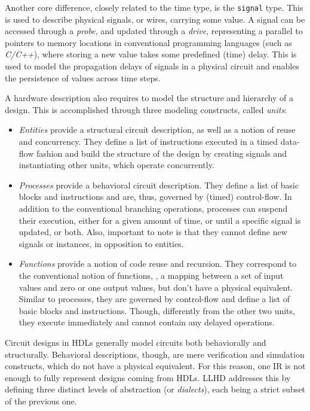 Another core difference, closely related to the time type, is the \texttt{signal} type. This is used to describe physical signals, or wires, carrying some value. A signal can be accessed through a \textit{probe}, and updated through a \textit{drive}, representing a parallel to pointers to memory locations in conventional programming languages (such as \textit{C/C++}), where storing a new value takes some predefined (time) delay. This is used to model the propagation delays of signals in a physical circuit and enables the persistence of values across time steps.

A hardware description also requires to model the structure and hierarchy of a design. This is accomplished through three modeling constructs, called \textit{units}:
\begin{itemize}
    \item \textit{Entities} provide a structural circuit description, as well as a notion of reuse and concurrency. They define a list of instructions executed in a timed data-flow fashion and build the structure of the design by creating signals and instantiating other units, which operate concurrently.
    \item \textit{Processes} provide a behavioral circuit description. They define a list of basic blocks and instructions and are, thus, governed by (timed) control-flow. In addition to the conventional branching operations, processes can suspend their execution, either for a given amount of time, or until a specific signal is updated, or both. Also, important to note is that they cannot define new signals or instances, in opposition to entities.
    \item \textit{Functions} provide a notion of code reuse and recursion. They correspond to the conventional notion of functions, \ie, a mapping between a set of input values and zero or one output values, but don’t have a physical equivalent. Similar to processes, they are governed by control-flow and define a list of basic blocks and instructions. Though, differently from the other two units, they execute immediately and cannot contain any delayed operations.
\end{itemize}


Circuit designs in HDLs generally model circuits both behaviorally and structurally. Behavioral descriptions, though, are mere verification and simulation constructs, which do not have a physical equivalent. For this reason, one IR is not enough to fully represent designs coming from HDLs. LLHD addresses this by defining three distinct levels of abstraction (or \textit{dialects}), each being a strict subset of the previous one.


